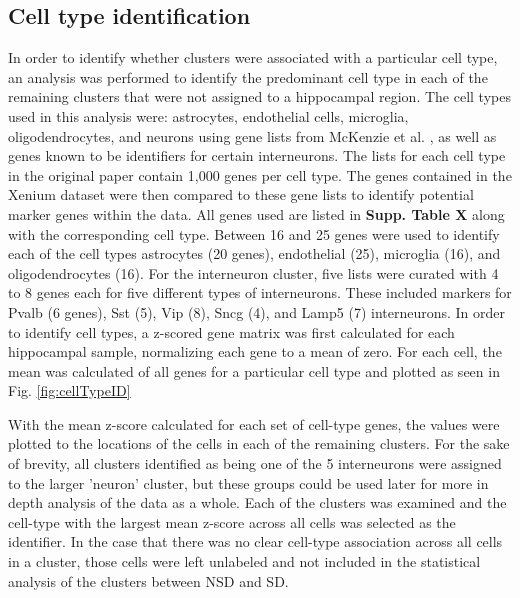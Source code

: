 \documentclass{article}
\begin{document}
\subsection{Cell type identification}

In order to identify whether clusters were associated with a particular cell type, an analysis was performed to identify the predominant cell type in each of the remaining clusters that were not assigned to a hippocampal region. The cell types used in this analysis were: astrocytes, endothelial cells, microglia, oligodendrocytes, and neurons using gene lists from McKenzie et al. \cite{cellTypeGenetics}, as well as genes known to be identifiers for certain interneurons. The lists for each cell type in the original paper contain 1,000 genes per cell type. The genes contained in the Xenium dataset were then compared to these gene lists to identify potential marker genes within the data. All genes used are listed in \textbf{Supp. Table X} along with the corresponding cell type. Between 16 and 25 genes were used to identify each of the cell types astrocytes (20 genes), endothelial (25), microglia (16), and oligodendrocytes (16). For the interneuron cluster, five lists were curated with 4 to 8 genes each for five different types of interneurons. These included markers for Pvalb (6 genes), Sst (5), Vip (8), Sncg (4), and Lamp5 (7) interneurons. In order to identify cell types, a z-scored gene matrix was first calculated for each hippocampal sample, normalizing each gene to a mean of zero. For each cell, the mean was calculated of all genes for a particular cell type and plotted as seen in Fig. \ref{fig:cellTypeID}

With the mean z-score calculated for each set of cell-type genes, the values were plotted to the locations of the cells in each of the remaining clusters. For the sake of brevity, all clusters identified as being one of the 5 interneurons were assigned to the larger 'neuron' cluster, but these groups could be used later for more in depth analysis of the data as a whole. Each of the clusters was examined and the cell-type with the largest mean z-score across all cells was selected as the identifier. In the case that there was no clear cell-type association across all cells in a cluster, those cells were left unlabeled and not included in the statistical analysis of the clusters between NSD and SD.
\end{document}
